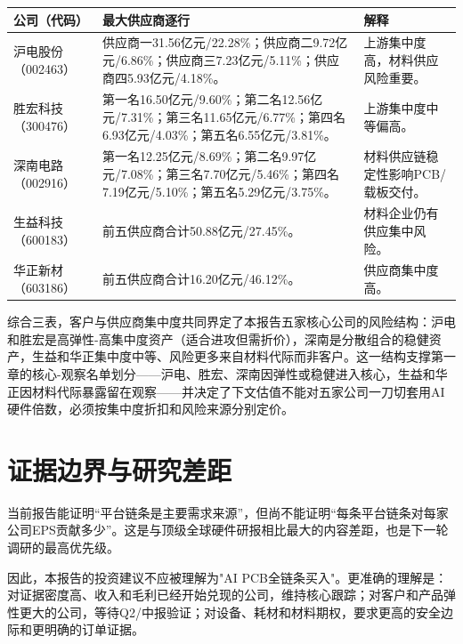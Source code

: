 \begin{exhibitbox}[图表5-16：年报匿名供应商明细]
\footnotesize
\begin{tabularx}{\textwidth}{L{1.8cm}X X}
\toprule
\textbf{公司（代码）} & \textbf{最大供应商逐行} & \textbf{解释} \\
\midrule
沪电股份（002463） & 供应商一31.56亿元/22.28\%；供应商二9.72亿元/6.86\%；供应商三7.23亿元/5.11\%；供应商四5.93亿元/4.18\%。 & 上游集中度高，材料供应风险重要。 \\
胜宏科技（300476） & 第一名16.50亿元/9.60\%；第二名12.56亿元/7.31\%；第三名11.65亿元/6.77\%；第四名6.93亿元/4.03\%；第五名6.55亿元/3.81\%。 & 上游集中度中等偏高。 \\
深南电路（002916） & 第一名12.25亿元/8.69\%；第二名9.97亿元/7.08\%；第三名7.70亿元/5.46\%；第四名7.19亿元/5.10\%；第五名5.29亿元/3.75\%。 & 材料供应链稳定性影响PCB/载板交付。 \\
生益科技（600183） & 前五供应商合计50.88亿元/27.45\%。 & 材料企业仍有供应集中风险。 \\
华正新材（603186） & 前五供应商合计16.20亿元/46.12\%。 & 供应商集中度高。 \\
\bottomrule
\end{tabularx}
\end{exhibitbox}

综合三表，客户与供应商集中度共同界定了本报告五家核心公司的风险结构：沪电和胜宏是高弹性-高集中度资产（适合进攻但需折价），深南是分散组合的稳健资产，生益和华正集中度中等、风险更多来自材料代际而非客户。这一结构支撑第一章的核心-观察名单划分——沪电、胜宏、深南因弹性或稳健进入核心，生益和华正因材料代际暴露留在观察——并决定了下文估值不能对五家公司一刀切套用AI硬件倍数，必须按集中度折扣和风险来源分别定价。

\section{证据边界与研究差距}

\begin{sourcequalitybox}[主要内容缺口]
当前报告能证明``平台链条是主要需求来源''，但尚不能证明``每条平台链条对每家公司EPS贡献多少''。这是与顶级全球硬件研报相比最大的内容差距，也是下一轮调研的最高优先级。
\end{sourcequalitybox}

因此，本报告的投资建议不应被理解为"AI PCB全链条买入"。更准确的理解是：对证据密度高、收入和毛利已经开始兑现的公司，维持核心跟踪；对客户和产品弹性更大的公司，等待Q2/中报验证；对设备、耗材和材料期权，要求更高的安全边际和更明确的订单证据。

